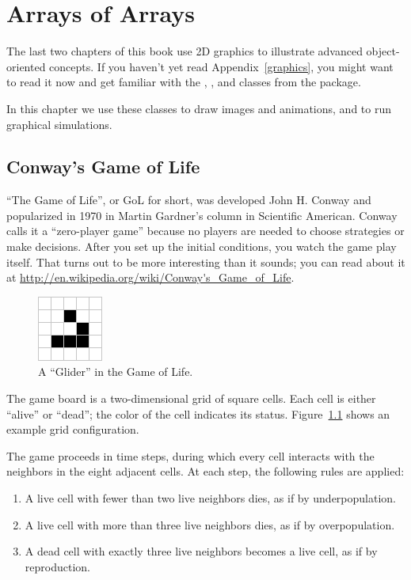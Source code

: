 \chapter{Arrays of Arrays}

The last two chapters of this book use 2D graphics to illustrate advanced object-oriented concepts.
If you haven't yet read Appendix~\ref{graphics}, you might want to read it now and get familiar with the , , and  classes from the  package.

In this chapter we use these classes to draw images and animations, and to run graphical simulations.


\section{Conway's Game of Life}

``The Game of Life'', or GoL for short, was developed John H. Conway and popularized in 1970 in Martin Gardner’s column in Scientific American.
Conway calls it a ``zero-player game'' because no players are needed to choose strategies or make decisions.
After you set up the initial conditions, you watch the game play itself.
That turns out to be more interesting than it sounds; you can read about it at \url{http://en.wikipedia.org/wiki/Conway's_Game_of_Life}.

\begin{figure}[!ht]
\begin{center}
\includegraphics{figs/glider.png}
\caption{A ``Glider'' in the Game of Life.}
\label{fig:glider}
\end{center}
\end{figure}

The game board is a two-dimensional grid of square cells.
Each cell is either ``alive'' or ``dead''; the color of the cell indicates its status.
Figure~\ref{fig:glider} shows an example grid configuration.


The game proceeds in time steps, during which every cell interacts with the neighbors in the eight adjacent cells.
At each step, the following rules are applied:

\begin{enumerate}
\item A live cell with fewer than two live neighbors dies, as if by underpopulation.
\item A live cell with more than three live neighbors dies, as if by overpopulation.
\item A dead cell with exactly three live neighbors becomes a live cell, as if by reproduction.
\end{enumerate}

